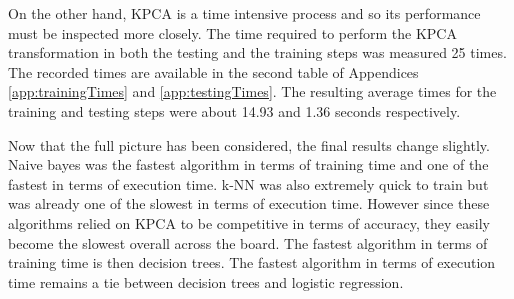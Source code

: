 On the other hand, KPCA is a time intensive process and so its performance must be inspected more closely. The time required to perform the KPCA transformation in both the testing and the training steps was measured 25 times. The recorded times are available in the second table of Appendices \ref{app:trainingTimes} and \ref{app:testingTimes}. The resulting average times for the training and testing steps were about 14.93 and 1.36 seconds respectively.

Now that the full picture has been considered, the final results change slightly. Naive bayes was the fastest algorithm in terms of training time and one of the fastest in terms of execution time. k-NN was also extremely quick to train but was already one of the slowest in terms of execution time. However since these algorithms relied on KPCA to be competitive in terms of accuracy, they easily become the slowest overall across the board. The fastest algorithm in terms of training time is then decision trees. The fastest algorithm in terms of execution time remains a tie between decision trees and logistic regression.
